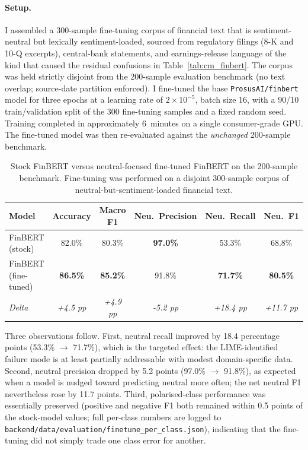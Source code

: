 \paragraph{Setup.} I assembled a 300-sample fine-tuning corpus of financial text that is sentiment-neutral but lexically sentiment-loaded, sourced from regulatory filings (8-K and 10-Q excerpts), central-bank statements, and earnings-release language of the kind that caused the residual confusions in Table~\ref{tab:cm_finbert}. The corpus was held strictly disjoint from the 200-sample evaluation benchmark (no text overlap; source-date partition enforced). I fine-tuned the base \texttt{ProsusAI/finbert} model for three epochs at a learning rate of $2 \times 10^{-5}$, batch size 16, with a 90/10 train/validation split of the 300 fine-tuning samples and a fixed random seed. Training completed in approximately 6~minutes on a single consumer-grade GPU. The fine-tuned model was then re-evaluated against the \emph{unchanged} 200-sample benchmark.

\begin{table}[H]
  \centering
  \caption{Stock FinBERT versus neutral-focused fine-tuned FinBERT on the 200-sample benchmark. Fine-tuning was performed on a disjoint 300-sample corpus of neutral-but-sentiment-loaded financial text.}
  \label{tab:finetune}
  \begin{tabular}{@{}lccccc@{}}
    \toprule
    \textbf{Model} & \textbf{Accuracy} & \textbf{Macro F1} & \textbf{Neu.\ Precision} & \textbf{Neu.\ Recall} & \textbf{Neu.\ F1} \\
    \midrule
    FinBERT (stock)        & 82.0\% & 80.3\% & \textbf{97.0\%} & 53.3\% & 68.8\% \\
    FinBERT (fine-tuned)   & \textbf{86.5\%} & \textbf{85.2\%} & 91.8\% & \textbf{71.7\%} & \textbf{80.5\%} \\
    \midrule
    \textit{Delta}         & \textit{+4.5 pp} & \textit{+4.9 pp} & \textit{-5.2 pp} & \textit{+18.4 pp} & \textit{+11.7 pp} \\
    \bottomrule
  \end{tabular}
\end{table}

Three observations follow. First, neutral recall improved by 18.4 percentage points (53.3\% $\to$ 71.7\%), which is the targeted effect: the LIME-identified failure mode is at least partially addressable with modest domain-specific data. Second, neutral precision dropped by 5.2 points (97.0\% $\to$ 91.8\%), as expected when a model is nudged toward predicting neutral more often; the net neutral F1 nevertheless rose by 11.7 points. Third, polarised-class performance was essentially preserved (positive and negative F1 both remained within 0.5 points of the stock-model values; full per-class numbers are logged to \texttt{backend/data/evaluation/finetune\_per\_class.json}), indicating that the fine-tuning did not simply trade one class error for another.

